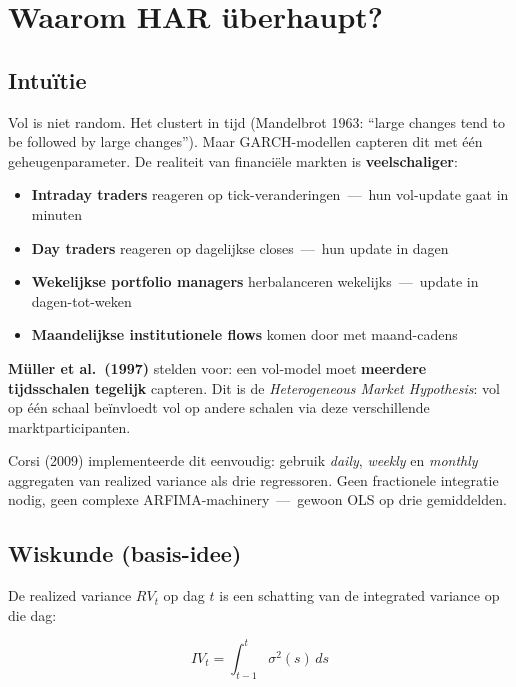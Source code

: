 \hypertarget{waarom-har-uxfcberhaupt}{%
\section{Waarom HAR überhaupt?}\label{waarom-har-uxfcberhaupt}}

\hypertarget{intuuxeftie}{%
\subsection{Intuïtie}\label{intuuxeftie}}

Vol is niet random. Het clustert in tijd (Mandelbrot 1963: ``large changes tend to be followed by large changes''). Maar GARCH-modellen capteren dit met één geheugenparameter. De realiteit van financiële markten is \textbf{veelschaliger}:

\begin{itemize}
\tightlist
\item
  \textbf{Intraday traders} reageren op tick-veranderingen \,---\, hun vol-update gaat in minuten
\item
  \textbf{Day traders} reageren op dagelijkse closes \,---\, hun update in dagen
\item
  \textbf{Wekelijkse portfolio managers} herbalanceren wekelijks \,---\, update in dagen-tot-weken
\item
  \textbf{Maandelijkse institutionele flows} komen door met maand-cadens
\end{itemize}

\textbf{Müller et al.~(1997)} stelden voor: een vol-model moet \textbf{meerdere tijdsschalen tegelijk} capteren. Dit is de \emph{Heterogeneous Market Hypothesis}: vol op één schaal beïnvloedt vol op andere schalen via deze verschillende marktparticipanten.

Corsi (2009) implementeerde dit eenvoudig: gebruik \emph{daily}, \emph{weekly} en \emph{monthly} aggregaten van realized variance als drie regressoren. Geen fractionele integratie nodig, geen complexe ARFIMA-machinery \,---\, gewoon OLS op drie gemiddelden.

\hypertarget{wiskunde-basis-idee}{%
\subsection{Wiskunde (basis-idee)}\label{wiskunde-basis-idee}}

De realized variance \(RV_t\) op dag \(t\) is een schatting van de integrated variance op die dag:

\[IV_t = \int_{t-1}^{t} \sigma^2(s) \, ds\]

